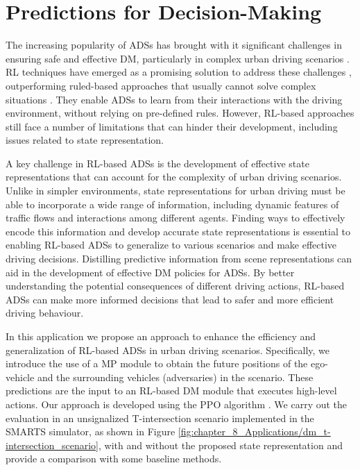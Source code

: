 \section{Predictions for Decision-Making}
\label{sec:8_decision_making}


The increasing popularity of \acp{ADS} has brought with it significant challenges in ensuring safe and effective \ac{DM}, particularly in complex urban driving scenarios \cite{Yurtsever2019}. \ac{RL} techniques have emerged as a promising solution to address these challenges \cite{Ravi2020}, outperforming ruled-based approaches that usually cannot solve complex situations \cite{Zhu2019}. They enable \acp{ADS} to learn from their interactions with the driving environment, without relying on pre-defined rules. However, \ac{RL}-based approaches still face a number of limitations that can hinder their development, including issues related to state representation. %

A key challenge in \ac{RL}-based \acp{ADS} is the development of effective state representations that can account for the complexity of urban driving scenarios. Unlike in simpler environments, state representations for urban driving must be able to incorporate a wide range of information, including dynamic features of traffic flows and interactions among different agents. Finding ways to effectively encode this information and develop accurate state representations is essential to enabling \ac{RL}-based \acp{ADS} to generalize to various scenarios and make effective driving decisions. Distilling predictive information from scene representations can aid in the development of effective \ac{DM} policies for \acp{ADS}. By better understanding the potential consequences of different driving actions, \ac{RL}-based \acp{ADS} can make more informed decisions that lead to safer and more efficient driving behaviour.

In this application we propose an approach to enhance the efficiency and generalization of \ac{RL}-based \acp{ADS} in urban driving scenarios. Specifically, we introduce the use of a \ac{MP} module to obtain the future positions of the ego-vehicle and the surrounding vehicles (adversaries) in the scenario. These predictions are the input to an \ac{RL}-based \ac{DM} module that executes high-level actions. Our approach is developed using the \ac{PPO} algorithm  \cite{Schulman2017}.  We carry out the evaluation in an unsignalized T-intersection scenario implemented in the \ac{SMARTS} simulator, as shown in Figure \ref{fig:chapter_8_Applications/dm_t-intersection_scenario}, with and without the proposed state representation and provide a comparison with some baseline methods.

